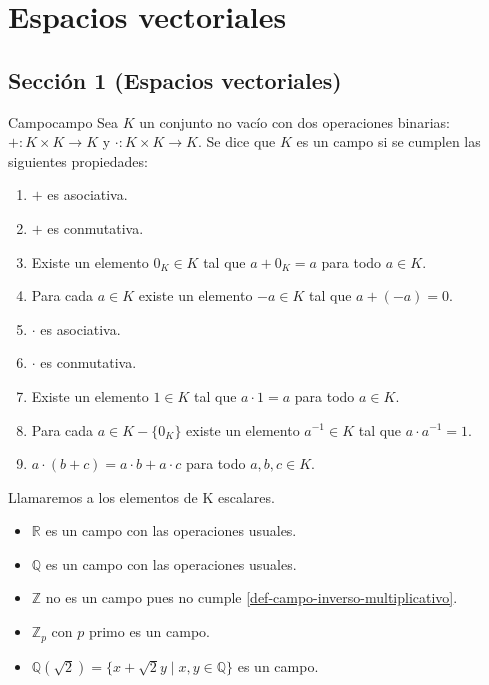 \chapter{Espacios vectoriales}

\section{Sección 1 (Espacios vectoriales)}
\begin{definition}{Campo}{campo} 
    Sea $K$ un conjunto no vacío con dos operaciones binarias:\\ $+:K\times K\rightarrow K$ y $\cdot:K\times K\rightarrow K$. Se dice que $K$ es un campo si se cumplen las siguientes propiedades:
    \begin{enumerate}
        \item $+$ es asociativa. \label{def-campo-asociativa-aditiva}
        \item $+$ es conmutativa. \label{def-campo-conmutativa-aditiva}
        \item Existe un elemento $0_K\in K$ tal que $a+0_K=a$ para todo $a\in K$. \label{def-campo-neutro-aditivo}
        \item Para cada $a\in K$ existe un elemento $-a\in K$ tal que $a+(-a)=0$. \label{def-campo-inverso-aditivo}
        \item $\cdot$ es asociativa. \label{def-campo-asociativa-multiplicativa}
        \item $\cdot$ es conmutativa. \label{def-campo-conmutativa-multiplicativa}
        \item Existe un elemento $1\in K$ tal que $a\cdot 1=a$ para todo $a\in K$. \label{def-campo-neutro-multiplicativo}
        \item Para cada $a\in K - \{0_K\}$ existe un elemento $a^{-1}\in K$ tal que $a\cdot a^{-1}=1$. \label{def-campo-inverso-multiplicativo}
        \item $a \cdot (b+c)=a\cdot b + a\cdot c$ para todo $a,b,c\in K$. \label{def-campo-distributiva-izquierda}
    \end{enumerate}
    Llamaremos a los elementos de K escalares.
\end{definition}


\begin{example}{}{}
\begin{itemize}
    \item $\mathbb{R}$ es un campo con las operaciones usuales.
    \item $\mathbb{Q}$ es un campo con las operaciones usuales.
    \item $\mathbb{Z}$ no es un campo pues no cumple \ref{def-campo-inverso-multiplicativo}.
    \item $\mathbb{Z}_p$ con $p$ primo es un campo.
    \item $\mathbb{Q}(\sqrt{2}) = \{x + \sqrt{2}y \mid x,y \in \mathbb{Q}\}$ es un campo.
    

\end{itemize}

\end{example}

